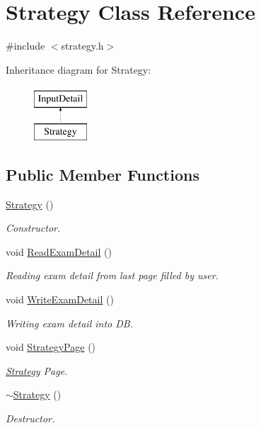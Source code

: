 \hypertarget{classStrategy}{\section{Strategy Class Reference}
\label{classStrategy}
}


{\ttfamily \#include $<$strategy.\-h$>$}

Inheritance diagram for Strategy\-:\begin{figure}[H]
\begin{center}
\leavevmode
\includegraphics[height=2.000000cm]{classStrategy}
\end{center}
\end{figure}
\subsection*{Public Member Functions}
\begin{DoxyCompactItemize}
\item 
\hyperlink{classStrategy_a2021a15bbc4f0d13f7b92f8933db2235}{Strategy} ()
\begin{DoxyCompactList}\small\item\em Constructor. \end{DoxyCompactList}\item 
void \hyperlink{classStrategy_abb7a716f8403d4ec3d5d127f789ba6ba}{Read\-Exam\-Detail} ()
\begin{DoxyCompactList}\small\item\em Reading exam detail from last page filled by user. \end{DoxyCompactList}\item 
void \hyperlink{classStrategy_a3825da44242fdf8442ffbd9cfd922803}{Write\-Exam\-Detail} ()
\begin{DoxyCompactList}\small\item\em Writing exam detail into D\-B. \end{DoxyCompactList}\item 
void \hyperlink{classStrategy_ac3f851b75390a71e3a4c6dfd9b15dafb}{Strategy\-Page} ()
\begin{DoxyCompactList}\small\item\em \hyperlink{classStrategy}{Strategy} Page. \end{DoxyCompactList}\item 
\hyperlink{classStrategy_a37c0bbdd64fd7dfcdd91578784a64775}{$\sim$\-Strategy} ()
\begin{DoxyCompactList}\small\item\em Destructor. \end{DoxyCompactList}\end{DoxyCompactItemize}
